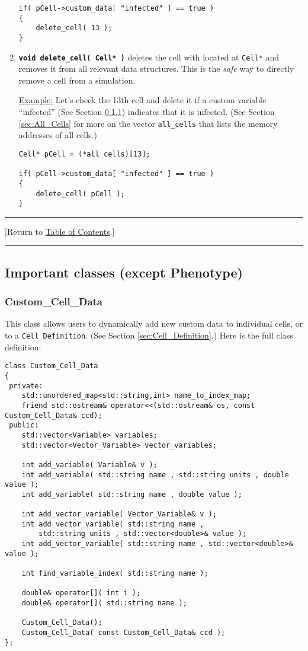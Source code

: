 \documentclass[12pt]{article}
\renewcommand{\v}{\verb}
\newcommand{\smallcode}[1]{\textbf{\texttt{#1}}}
\newcommand{\TOClink}{\begin{center}\hrule\vskip-5pt\phantom{.}\hfill[Return to \hyperlink{TOC}{Table of Contents}.]\hfill\phantom{.}\vskip3pt\hrule\end{center}}
\begin{document}
\begin{enumerate}
\begin{verbatim}
if( pCell->custom_data[ "infected" ] == true )
{
    delete_cell( 13 ); 
}
\end{verbatim}

\item 
\smallcode{void delete\_cell( Cell* )} deletes the cell 
with located at \v|Cell*| and removes it from 
all relevant data structures.  
This is the \emph{safe} way to directly remove a cell 
from a simulation. 

\underline{Example:} Let's check the 13th cell  and delete it 
if a custom variable ``infected'' (See Section \ref{sec:Custom_Cell_Data}) indicates that 
 it is infected. (See Section \ref{sec:All_Cells} for more 
on the vector \v|all_cells| that lists the memory addresses of all cells.)
 
\begin{verbatim}
Cell* pCell = (*all_cells)[13]; 

if( pCell->custom_data[ "infected" ] == true )
{
    delete_cell( pCell ); 
}
\end{verbatim}
\end{enumerate}
 

\TOClink 

\subsection{Important classes (except Phenotype)}

\subsubsection{Custom\_Cell\_Data}
\label{sec:Custom_Cell_Data}
This class allows users to dynamically add new custom data to 
individual cells, or to a \v|Cell_Definition|. (See Section 
\ref{sec:Cell_Definition}.) Here is the full class definition: 

\begin{verbatim}
class Custom_Cell_Data
{
 private:
    std::unordered_map<std::string,int> name_to_index_map; 
    friend std::ostream& operator<<(std::ostream& os, const Custom_Cell_Data& ccd);   
 public:
    std::vector<Variable> variables; 
    std::vector<Vector_Variable> vector_variables; 
    
    int add_variable( Variable& v );   
    int add_variable( std::string name , std::string units , double value );   
    int add_variable( std::string name , double value );   

    int add_vector_variable( Vector_Variable& v );   
    int add_vector_variable( std::string name , 
        std::string units , std::vector<double>& value );   
    int add_vector_variable( std::string name , std::vector<double>& value );   

    int find_variable_index( std::string name );   

    double& operator[]( int i );  
    double& operator[]( std::string name );   
    
    Custom_Cell_Data();   
    Custom_Cell_Data( const Custom_Cell_Data& ccd ); 
};
\end{verbatim}
\end{document}
